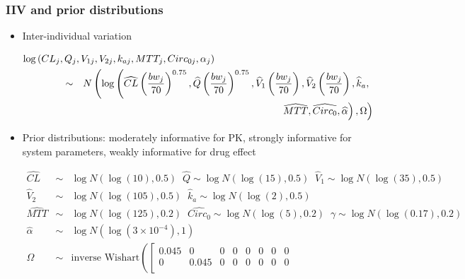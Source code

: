 \documentclass{beamer}
\begin{document}
\begin{frame}[shrink]
  \frametitle{IIV and prior distributions}

  \begin{itemize}
  \footnotesize
\item Inter-individual variation
  \begin{scriptsize}
    \begin{eqnarray*}
      \lefteqn{\log\left(CL_j,Q_j,V_{1j},V_{2j},k_{aj},MTT_j,Circ_{0j},\alpha_j\right)}\ \ \ \ \ \ \ \ \ \ \ \  \\
      &\sim& N\left(\log\left(\widehat{CL}\left(\frac{bw_j}{70}\right)^{0.75},\widehat{Q}\left(\frac{bw_j}{70}\right)^{0.75},
          \widehat{V}_1\left(\frac{bw_j}{70}\right),\widehat{V}_2\left(\frac{bw_j}{70}\right),\widehat{k}_a,\right.\right.
             \\
    & & \left. \left.\widehat{MTT}, \widehat{Circ_0}, \widehat{\alpha}\right),\Omega\right)
    \end{eqnarray*}
  \end{scriptsize}
\item Prior distributions: moderately informative for PK, strongly
  informative for system parameters, weakly informative for drug effect
  \begin{scriptsize}
    \begin{eqnarray*}
      \widehat{CL} &\sim&  \log N\left(\log(10),
                                           0.5\right) \;\;
                                           \widehat{Q}
                                           \sim  \log N\left(\log(15),
                                           0.5\right) \;\;
      \widehat{V}_1 \sim  \log N\left(\log(35), 0.5\right) \\
      \widehat{V}_2 &\sim&  \log N\left(\log(105), 0.5\right) \;\;
      \widehat{k}_a \sim
                                            \log N\left(\log(2),
                           0.5\right) \\
      \widehat{MTT} &\sim& \log N\left(\log(125), 0.2\right) \;\; 
      \widehat{Circ_0} \sim \log N\left(\log(5), 0.2\right) \;\;
      \gamma \sim \log N\left(\log(0.17), 0.2\right) \\
      \widehat{\alpha} &\sim& \log N\left(\log(3\times 10^{-4}), 1\right) \\
     \Omega &\sim& \text{inverse Wishart}\left(\left[\begin{array}{cccccccc}
                 0.045 & 0 & 0 & 0 & 0 & 0 & 0 & 0  \\
                 0 & 0.045 & 0 & 0 & 0 & 0 & 0 & 0 \\  

\end{array}
\end{eqnarray*}
\end{scriptsize}
\end{itemize}
\end{frame}
\end{document}
